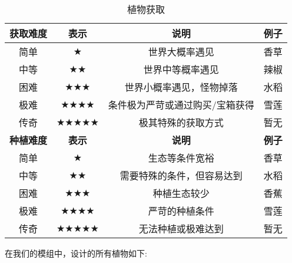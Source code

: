 \begin{table}[H]
    \centering
    \caption{植物获取}
    \label{table:植物获取}
    \setlength{\tabcolsep}{4mm}
    \begin{tabular}{c|ccc}
        \toprule
        \textbf{获取难度} & \textbf{表示}                                  & \textbf{说明}                   & \textbf{例子} \\
        \midrule
        简单              & $\bigstar$                                     & 世界大概率遇见                  & 香草          \\
        中等              & $\bigstar\bigstar$                             & 世界中等概率遇见                & 辣椒          \\
        困难              & $\bigstar \bigstar \bigstar$                   & 世界小概率遇见，怪物掉落        & 水稻          \\
        极难              & $\bigstar \bigstar \bigstar \bigstar$          & 条件极为严苛或通过购买/宝箱获得 & 雪莲          \\
        传奇              & $\bigstar \bigstar \bigstar \bigstar \bigstar$ & 极其特殊的获取方式              & 暂无          \\
        \midrule
        \textbf{种植难度} & \textbf{表示}                                  & \textbf{说明}                   & \textbf{例子} \\
        \midrule
        简单              & $\bigstar$                                     & 生态等条件宽裕                  & 香草          \\
        中等              & $\bigstar\bigstar$                             & 需要特殊的条件，但容易达到      & 水稻          \\
        困难              & $\bigstar \bigstar \bigstar$                   & 种植生态较少                    & 香蕉          \\
        极难              & $\bigstar \bigstar \bigstar \bigstar$          & 严苛的种植条件                  & 雪莲          \\
        传奇              & $\bigstar \bigstar \bigstar \bigstar \bigstar$ & 无法种植或极难达到              & 暂无          \\
        \bottomrule
    \end{tabular}
\end{table}

在我们的模组中，设计的所有植物如下:

